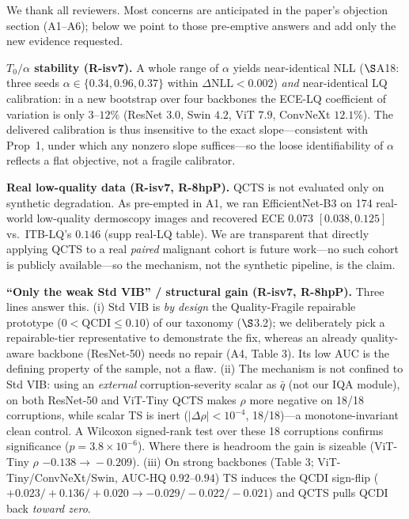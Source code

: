 
We thank all reviewers. Most concerns are anticipated in the paper's objection section (A1--A6); below we point to those pre-emptive answers and add only the new evidence requested.

\textbf{$T_0/\alpha$ stability (R-isv7).} A whole range of $\alpha$ yields near-identical NLL ($\S$A18: three seeds $\alpha\in\{0.34,0.96,0.37\}$ within $\Delta\mathrm{NLL}<0.002$) \emph{and} near-identical LQ calibration: in a new bootstrap over four backbones the ECE-LQ coefficient of variation is only $3$--$12\%$ (ResNet $3.0$, Swin $4.2$, ViT $7.9$, ConvNeXt $12.1\%$). The delivered calibration is thus insensitive to the exact slope---consistent with Prop~1, under which any nonzero slope suffices---so the loose identifiability of $\alpha$ reflects a flat objective, not a fragile calibrator.

\textbf{Real low-quality data (R-isv7, R-8hpP).} QCTS is not evaluated only on synthetic degradation. As pre-empted in A1, we ran EfficientNet-B3 on 174 real-world low-quality dermoscopy images and recovered ECE $0.073$ $[0.038,0.125]$ vs.\ ITB-LQ's $0.146$ (supp real-LQ table). We are transparent that directly applying QCTS to a real \emph{paired} malignant cohort is future work---no such cohort is publicly available---so the mechanism, not the synthetic pipeline, is the claim.

\textbf{``Only the weak Std VIB'' / structural gain (R-isv7, R-8hpP).} Three lines answer this. (i) Std VIB is \emph{by design} the Quality-Fragile repairable prototype ($0<\mathrm{QCDI}\le0.10$) of our taxonomy ($\S$3.2); we deliberately pick a repairable-tier representative to demonstrate the fix, whereas an already quality-aware backbone (ResNet-50) needs no repair (A4, Table 3). Its low AUC is the defining property of the sample, not a flaw. (ii) The mechanism is not confined to Std VIB: using an \emph{external} corruption-severity scalar as $\bar q$ (not our IQA module), on both ResNet-50 and ViT-Tiny QCTS makes $\rho$ more negative on 18/18 corruptions, while scalar TS is inert ($|\Delta\rho|<10^{-4}$, 18/18)---a monotone-invariant clean control. A Wilcoxon signed-rank test over these 18 corruptions confirms significance ($p=3.8\times10^{-6}$). Where there is headroom the gain is sizeable (ViT-Tiny $\rho$ $-0.138\!\to\!-0.209$). (iii) On strong backbones (Table 3; ViT-Tiny/ConvNeXt/Swin, AUC-HQ $0.92$--$0.94$) TS induces the QCDI sign-flip ($+0.023/+0.136/+0.020 \to -0.029/-0.022/-0.021$) and QCTS pulls QCDI back \emph{toward zero}.

